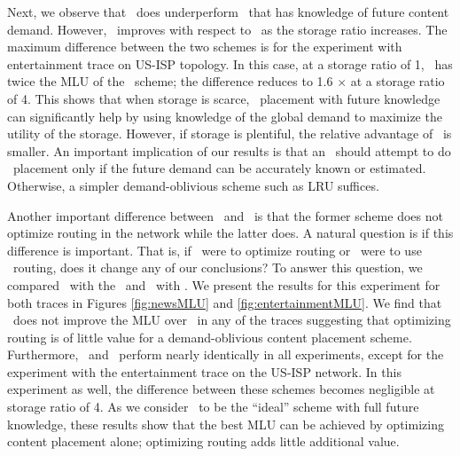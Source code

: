 {%
Next, we observe that \invlru\ does underperform \optrpfuture\ that has knowledge of future content demand. However, \invlru\ improves with respect to \optrpfuture\ as the storage ratio increases.  The maximum difference between the two schemes is for the experiment with entertainment trace on US-ISP topology. In this case, at a storage ratio of 1,  \invlru\ has twice the MLU of the \optrpfuture\ scheme; the difference reduces to 1.6 $\times$ at a storage ratio of 4. This shows that when storage is scarce, \planned\  placement with future knowledge can significantly help by using knowledge of the global demand to maximize the utility of the storage. However, if storage is plentiful, the relative advantage of \optrpfuture\ is smaller. An important implication of our results is that an \ncp\ should attempt to do \planned\  placement only if the future demand can be accurately known or estimated. Otherwise, a simpler demand-oblivious scheme such as LRU suffices.


Another important difference between \invlru\ and \optrpfuture\ is that the former scheme does not optimize routing in the network while the latter does. A natural question is if this difference is important. That is, if  \invlru\  were to optimize routing or   \optrpfuture\  were to use \invcap\ routing, does it change any of our conclusions? To answer this question, we compared \invlru\ with the \optlru\ and \optrpfuture\ with \invoptpfuture.   We present the results for this experiment for both traces in Figures \ref{fig:newsMLU} and \ref{fig:entertainmentMLU}.
We find that \optlru\ does not improve the MLU over  \invlru\ in any of the traces suggesting that optimizing routing is of little value for a demand-oblivious content placement scheme.  Furthermore, \optrpfuture\  and \invoptpfuture\ perform nearly identically in  all experiments, except for the experiment with the entertainment trace on the US-ISP network. In this experiment as well, the difference between these schemes becomes negligible at storage ratio of 4. As we consider \optrpfuture\ to be the ``ideal'' scheme with full future knowledge, these results show that the best MLU can be achieved by optimizing content placement alone; optimizing routing adds little additional value.





}
